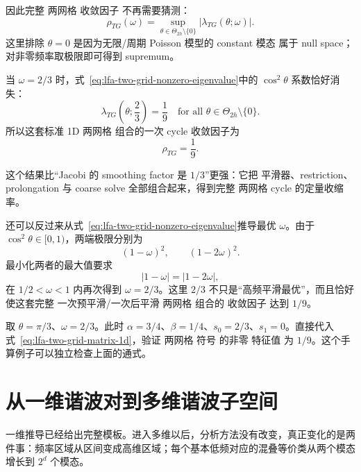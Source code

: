 因此完整 两网格 收敛因子 不再需要猜测：
\begin{equation}
\rho_{TG}(\omega)
=\sup_{\theta\in\Theta_{2h}\setminus\{0\}}
\left|\lambda_{TG}(\theta;\omega)\right|.
\label{eq:lfa-two-grid-convergence-factor-1d}
\end{equation}
这里排除 $\theta=0$ 是因为无限/周期 Poisson 模型的 constant 模态 属于 null space；对非零频率取极限即可得到 supremum。

当 $\omega=2/3$ 时，式~\eqref{eq:lfa-two-grid-nonzero-eigenvalue}中的 $\cos^2\theta$ 系数恰好消失：
\begin{equation}
\boxed{
\lambda_{TG}\left(\theta;\frac23\right)=\frac19
\quad\text{for all }\theta\in\Theta_{2h}\setminus\{0\}.}
\label{eq:lfa-two-grid-one-ninth}
\end{equation}
所以这套标准 1D 两网格 组合的一次 cycle 收敛因子为
\begin{equation}
\boxed{\rho_{TG}=\frac19.}
\end{equation}

这个结果比“Jacobi 的 smoothing factor 是 $1/3$”更强：它把 平滑器、restriction、prolongation 与 coarse solve 全部组合起来，得到完整 两网格 cycle 的定量收缩率。

还可以反过来从式~\eqref{eq:lfa-two-grid-nonzero-eigenvalue}推导最优 $\omega$。由于 $\cos^2\theta\in[0,1)$，两端极限分别为
\begin{equation}
(1-\omega)^2,
\qquad
(1-2\omega)^2.
\end{equation}
最小化两者的最大值要求
\begin{equation}
|1-\omega|=|1-2\omega|,
\end{equation}
在 $1/2<\omega<1$ 内再次得到 $\omega=2/3$。这里 $2/3$ 不只是“高频平滑最优”，而且恰好使这套完整 一次预平滑/一次后平滑 两网格 组合的 收敛因子 达到 $1/9$。

\begin{checkpointbox}
取 $\theta=\pi/3$、$\omega=2/3$。此时 $\alpha=3/4$、$\beta=1/4$、$s_0=2/3$、$s_1=0$。直接代入式~\eqref{eq:lfa-two-grid-matrix-1d}，验证 两网格 符号 的非零 特征值 为 $1/9$。这个手算例子可以独立检查上面的通式。
\end{checkpointbox}

\section{从一维谐波对到多维谐波子空间}
\label{sec:lfa-multidimensional-harmonics}

一维推导已经给出完整模板。进入多维以后，分析方法没有改变，真正变化的是两件事：频率区域从区间变成高维区域；每个基本低频对应的混叠等价类从两个模态增长到 $2^d$ 个模态。

